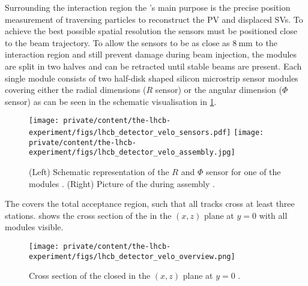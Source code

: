Surrounding the \protonproton interaction region the \VELO's main purpose is the
precise position measurement of traversing particles to reconstruct the \ac{PV}
and displaced \acp{SV}. To achieve the best possible spatial resolution the
sensors must be positioned close to the beam trajectory. To allow the sensors to
be as close as $\SI{8}{\milli\metre}$ to the interaction region and still
prevent damage during beam injection, the \VELO modules are split in two halves
and can be retracted until stable beams are present. Each single module consists
of two half-disk shaped silicon microstrip sensor modules covering either the
radial dimensions ($R$ sensor) or the angular dimension ($\Phi$ sensor) as can
be seen in the schematic visualisation in
\cref{fig:lhcb_experiment:tracking:velo:sensor}.
%
\begin{figure}[t]
  \texttt{[image: private/content/the-lhcb-experiment/figs/lhcb\_detector\_velo\_sensors.pdf]}
  \texttt{[image: private/content/the-lhcb-experiment/figs/lhcb\_detector\_velo\_assembly.jpg]}
  \caption{(Left) Schematic representation of the $R$ and $\Phi$ sensor for one
  of the \VELO modules \cite{Alves:2008zz}. (Right) Picture of the \VELO during
  assembly \cite{Aaij:1707015}. }
  \label{fig:lhcb_experiment:tracking:velo:sensor}
\end{figure}
%
The \VELO covers the total \LHCb acceptance region, such that all tracks cross
at least three \VELO stations. 
shows the cross section of the \VELO in the $(x,z)$ plane at $y=0$ with all
modules visible.
%
\begin{figure}[t]
  \texttt{[image: private/content/the-lhcb-experiment/figs/lhcb\_detector\_velo\_overview.png]}
  \caption{
    Cross section of the closed \VELO in the $(x,z)$ plane at $y=0$ \cite{Alves:2008zz}.
  }
  \label{fig:lhcb_experiment:tracking:velo:overview}
\end{figure}

